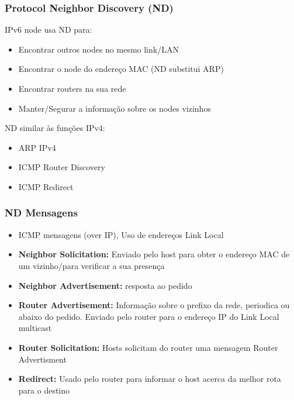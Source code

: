 \documentclass{article}
\begin{document}
\subsubsection{Protocol Neighbor Discovery (ND)}
IPv6 node usa ND para: 
\begin{itemize}
    \item Encontrar outros nodes no mesmo link/LAN
    \item Encontrar o node do endereço MAC (ND substitui ARP)
    \item Encontrar routers na sua rede
    \item Manter/Segurar a informação sobre os nodes vizinhos
\end{itemize}

ND similar às funções IPv4:
\begin{itemize}
    \item ARP IPv4
    \item ICMP Router Discovery
    \item ICMP Redirect
\end{itemize}

\subsubsection{ND Mensagens}
\begin{itemize}
    \item ICMP mensagens (over IP), Uso de endereços Link Local
    \item \textbf{Neighbor Solicitation: } Enviado pelo host para obter o endereço MAC de um vizinho/para verificar a sua presença
    \item \textbf{Neighbor Advertisement: } resposta ao pedido
    \item \textbf{Router Advertisement: } Informação sobre o prefixo da rede, periodica ou abaixo do pedido. Enviado pelo router para o endereço IP do Link Local multicast
    \item \textbf{Router Solicitation: } Hosts solicitam do router uma mensagem Router Advertisment
    \item \textbf{Redirect: } Usado pelo router para informar o host acerca da melhor rota para o destino
\end{itemize}
\end{document}
